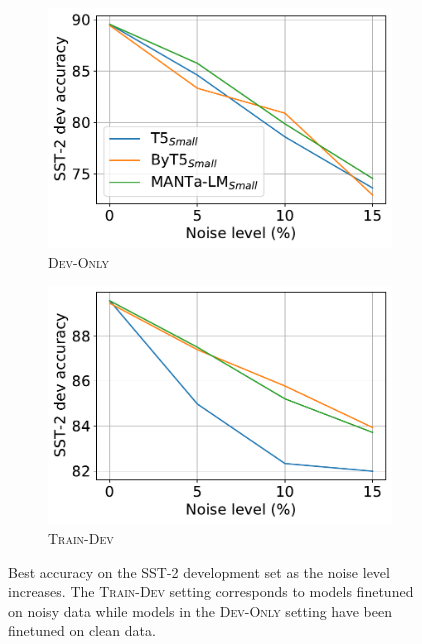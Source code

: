 \begin{figure}[t]
\centering\small
\begin{subfigure}[b]{\columnwidth}
\centering\small
\includegraphics[width=0.9\columnwidth]{sources/part_2/manta/images/noise_curve_dev.pdf}\vspace*{-2mm}
\caption{\textsc{Dev-Only}}
\end{subfigure}

\vspace{2mm}

\begin{subfigure}[b]{\columnwidth}
\centering\small
\includegraphics[width=0.9\columnwidth]{sources/part_2/manta/images/noise_curve.pdf}\vspace*{-2mm}
\caption{\textsc{Train-Dev}}
\end{subfigure}
\caption{Best accuracy on the SST-2 development set as the noise level increases. The \textsc{Train-Dev} setting corresponds to models finetuned on noisy data while models in the \textsc{Dev-Only} setting have been finetuned on clean data.}
\end{figure}

